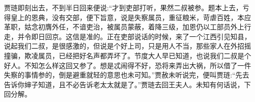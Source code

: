 \begin{parag}
    贾琏即刻出去，不到半日回来便说:“才到吏部打听，果然二叔被参。题本上去，亏得皇上的恩典，没有交部，便下旨意，说是失察属员，重征粮米，苛虐百姓，本应革职，姑念初膺外任，不谙吏治，被属员蒙蔽，着降三级，加恩仍以工部员外上行走，并令即日回京。这信是准的。正在吏部说话的时候，来了一个江西引见知县，说起我们二叔，是很感激的，但说是个好上司，只是用人不当，那些家人在外招摇撞骗，欺凌属员，已经把好名声都弄坏了。节度大人早已知道，也说我们二叔是个好人。不知怎么样这回又参了。想是忒闹得不好，恐将来弄出大祸，所以借了一件失察的事情参的，倒是避重就轻的意思也未可知。”贾赦未听说完，便叫贾琏:“先去告诉你婶子知道，且不必告诉老太太就是了。”贾琏去回王夫人。未知有何话说，下回分解。
\end{parag}